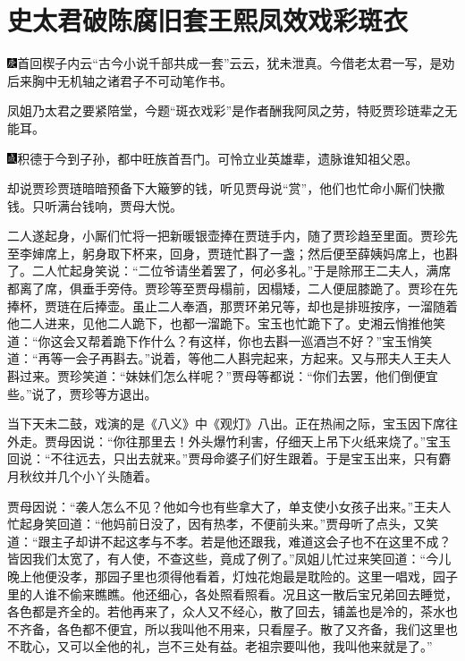 

\chapter{史太君破陈腐旧套\hspace{.5em}王熙凤效戏彩斑衣}

{\includegraphics[width=3mm]{../Images/00004}首回楔子内云``古今小说千部共成一套''云云，犹未泄真。今借老太君一写，是劝后来胸中无机轴之诸君子不可动笔作书。}

{凤姐乃太君之要紧陪堂，今题``斑衣戏彩''是作者酬我阿凤之劳，特贬贾珍琏辈之无能耳。}

{\includegraphics[width=3mm]{../Images/00005}积德于今到子孙，都中旺族首吾门。可怜立业英雄辈，遗脉谁知祖父恩。}

却说贾珍贾琏暗暗预备下大簸箩的钱，听见贾母说``赏''，他们也忙命小厮们快撒钱。只听满台钱响，贾母大悦。

二人遂起身，小厮们忙将一把新暖银壶捧在贾琏手内，随了贾珍趋至里面。贾珍先至李婶席上，躬身取下杯来，回身，贾琏忙斟了一盏；然后便至薛姨妈席上，也斟了。二人忙起身笑说：``二位爷请坐着罢了，何必多礼。''于是除邢王二夫人，满席都离了席，俱垂手旁侍。贾珍等至贾母榻前，因榻矮，二人便屈膝跪了。贾珍在先捧杯，贾琏在后捧壶。虽止二人奉酒，那贾环弟兄等，却也是排班按序，一溜随着他二人进来，见他二人跪下，也都一溜跪下。宝玉也忙跪下了。史湘云悄推他笑道：``你这会又帮着跪下作什么？有这样，你也去斟一巡酒岂不好？''宝玉悄笑道：``再等一会子再斟去。''说着，等他二人斟完起来，方起来。又与邢夫人王夫人斟过来。贾珍笑道：``妹妹们怎么样呢？''贾母等都说：``你们去罢，他们倒便宜些。''说了，贾珍等方退出。

当下天未二鼓，戏演的是《八义》中《观灯》八出。正在热闹之际，宝玉因下席往外走。贾母因说：``你往那里去！外头爆竹利害，仔细天上吊下火纸来烧了。''宝玉回说：``不往远去，只出去就来。''贾母命婆子们好生跟着。于是宝玉出来，只有麝月秋纹并几个小丫头随着。

贾母因说：``袭人怎么不见？他如今也有些拿大了，单支使小女孩子出来。''王夫人忙起身笑回道：``他妈前日没了，因有热孝，不便前头来。''贾母听了点头，又笑道：``跟主子却讲不起这孝与不孝。若是他还跟我，难道这会子也不在这里不成？皆因我们太宽了，有人使，不查这些，竟成了例了。''凤姐儿忙过来笑回道：``今儿晚上他便没孝，那园子里也须得他看着，灯烛花炮最是耽险的。这里一唱戏，园子里的人谁不偷来瞧瞧。他还细心，各处照看照看。况且这一散后宝兄弟回去睡觉，各色都是齐全的。若他再来了，众人又不经心，散了回去，铺盖也是冷的，茶水也不齐备，各色都不便宜，所以我叫他不用来，只看屋子。散了又齐备，我们这里也不耽心，又可以全他的礼，岂不三处有益。老祖宗要叫他，我叫他来就是了。''

